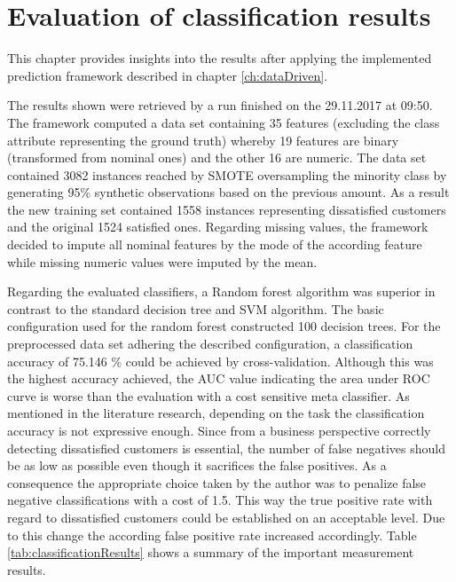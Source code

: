 \chapter{Evaluation of classification results}
\label{ch:evaluation}

This chapter provides insights into the results after applying the implemented prediction framework described in chapter \ref{ch:dataDriven}. 

The results shown were retrieved by a run finished on the 29.11.2017 at 09:50. The framework computed a data set containing 35 features (excluding the class attribute representing the ground truth) whereby 19 features are binary (transformed from nominal ones) and the other 16 are numeric. The data set contained 3082 instances reached by SMOTE oversampling the minority class by generating 95\% synthetic observations based on the previous amount. As a result the new training set contained 1558 instances representing dissatisfied customers and the original 1524 satisfied ones. Regarding missing values, the framework decided to impute all nominal features by the mode of the according feature while missing numeric values were imputed by the mean. 	

Regarding the evaluated classifiers, a Random forest algorithm was superior in contrast to the standard decision tree and SVM algorithm. The basic configuration used for the random forest constructed 100 decision trees. For the preprocessed data set adhering the described configuration, a classification accuracy of 75.146 \% could be achieved by cross-validation. Although this was the highest accuracy achieved, the AUC value indicating the area under ROC curve is worse than the evaluation with a cost sensitive meta classifier. As mentioned in the literature research, depending on the task the classification accuracy is not expressive enough. Since from a business perspective correctly detecting dissatisfied customers is essential, the number of false negatives should be as low as possible even though it sacrifices the false positives. As a consequence the appropriate choice taken by the author was to penalize false negative classifications with a cost of 1.5. This way the true positive rate with regard to dissatisfied customers could be established on an acceptable level. Due to this change the according false positive rate increased accordingly. Table \ref{tab:classificationResults} shows a summary of the important measurement results.

